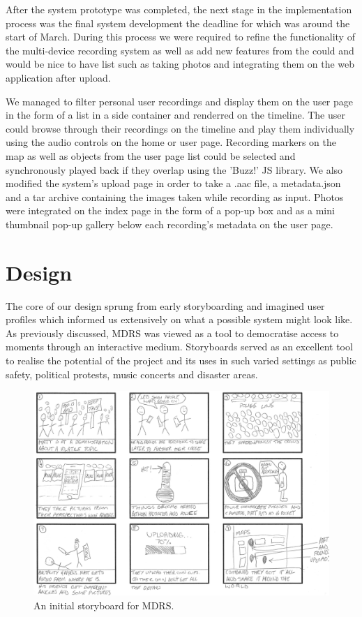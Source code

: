 \documentclass{l3proj}
\begin{document}
After the system prototype was completed, the next stage in the implementation process was the final system development the deadline for which was around the start of March.
 During this process we were required to refine the functionality of the multi-device recording system as well as add new features
 from the could and would be nice to have list such as taking photos and integrating them on the web application after upload.

 We managed to filter personal user recordings and display them on the user page in the form of a list in a side container and renderred on the timeline.
 The user could browse through their recordings on the timeline and play them individually using the audio controls on the home or user page.
 Recording markers on the map as well as objects from the user page list could be selected and synchronously played back if they overlap using the 'Buzz!' JS library.
 We also modified the system's upload page in order to take a .aac file, a metadata.json and a tar archive containing the images taken while recording as input.
 Photos were integrated on the index page in the form of a pop-up box and as a mini thumbnail pop-up gallery below each recording's metadata on the user page.

\chapter{Design}
\label{design}

The core of our design sprung from early storyboarding and imagined user
profiles which informed us extensively on what a possible system might look
like. As previously discussed, MDRS was viewed as a tool to democratise access to moments through an interactive medium. Storyboards served as an excellent tool to realise the potential of the project and its uses in such varied settings as public safety, political protests, music concerts and disaster areas.

\begin{figure}[ht!]
\centering
\includegraphics[width=1\textwidth]{images/ally-storyboard.jpg}
\caption{An initial storyboard for MDRS.}
\end{figure}
\end{document}
